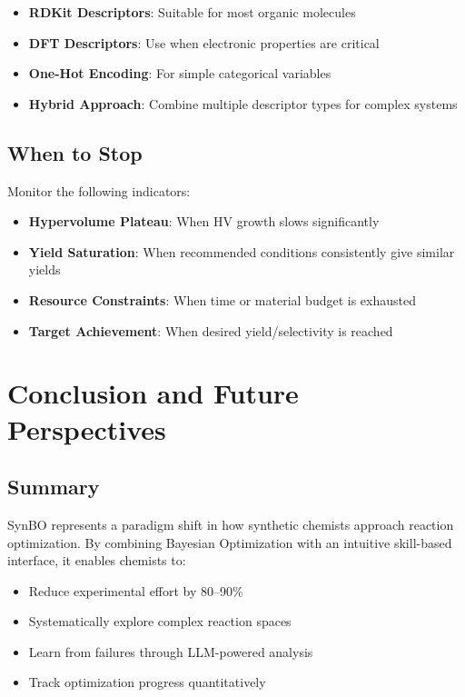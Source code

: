 \documentclass[12pt,a4paper]{article}
\begin{document}
\begin{itemize}
    \item \textbf{RDKit Descriptors}: Suitable for most organic molecules
    \item \textbf{DFT Descriptors}: Use when electronic properties are critical
    \item \textbf{One-Hot Encoding}: For simple categorical variables
    \item \textbf{Hybrid Approach}: Combine multiple descriptor types for complex systems
\end{itemize}

\subsection{When to Stop}

Monitor the following indicators:
\begin{itemize}
    \item \textbf{Hypervolume Plateau}: When HV growth slows significantly
    \item \textbf{Yield Saturation}: When recommended conditions consistently give similar yields
    \item \textbf{Resource Constraints}: When time or material budget is exhausted
    \item \textbf{Target Achievement}: When desired yield/selectivity is reached
\end{itemize}

\section{Conclusion and Future Perspectives}
\label{sec:conclusion}

\subsection{Summary}

SynBO represents a paradigm shift in how synthetic chemists approach reaction optimization. By combining Bayesian Optimization with an intuitive skill-based interface, it enables chemists to:

\begin{itemize}
    \item Reduce experimental effort by 80--90\%
    \item Systematically explore complex reaction spaces
    \item Learn from failures through LLM-powered analysis
    \item Track optimization progress quantitatively
\end{itemize}
\end{document}
